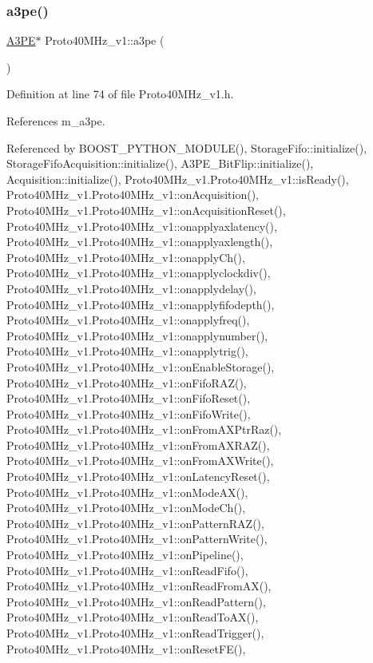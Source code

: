\subsubsection{\texorpdfstring{a3pe()}{a3pe()}}
{\footnotesize\ttfamily \hyperlink{classA3PE}{A3\+PE}$\ast$ Proto40\+M\+Hz\+\_\+v1\+::a3pe (\begin{DoxyParamCaption}{ }\end{DoxyParamCaption})\hspace{0.3cm}{\ttfamily [inline]}}



Definition at line 74 of file Proto40\+M\+Hz\+\_\+v1.\+h.



References m\+\_\+a3pe.



Referenced by B\+O\+O\+S\+T\+\_\+\+P\+Y\+T\+H\+O\+N\+\_\+\+M\+O\+D\+U\+L\+E(), Storage\+Fifo\+::initialize(), Storage\+Fifo\+Acquisition\+::initialize(), A3\+P\+E\+\_\+\+Bit\+Flip\+::initialize(), Acquisition\+::initialize(), Proto40\+M\+Hz\+\_\+v1.\+Proto40\+M\+Hz\+\_\+v1\+::is\+Ready(), Proto40\+M\+Hz\+\_\+v1.\+Proto40\+M\+Hz\+\_\+v1\+::on\+Acquisition(), Proto40\+M\+Hz\+\_\+v1.\+Proto40\+M\+Hz\+\_\+v1\+::on\+Acquisition\+Reset(), Proto40\+M\+Hz\+\_\+v1.\+Proto40\+M\+Hz\+\_\+v1\+::onapplyaxlatency(), Proto40\+M\+Hz\+\_\+v1.\+Proto40\+M\+Hz\+\_\+v1\+::onapplyaxlength(), Proto40\+M\+Hz\+\_\+v1.\+Proto40\+M\+Hz\+\_\+v1\+::onapply\+Ch(), Proto40\+M\+Hz\+\_\+v1.\+Proto40\+M\+Hz\+\_\+v1\+::onapplyclockdiv(), Proto40\+M\+Hz\+\_\+v1.\+Proto40\+M\+Hz\+\_\+v1\+::onapplydelay(), Proto40\+M\+Hz\+\_\+v1.\+Proto40\+M\+Hz\+\_\+v1\+::onapplyfifodepth(), Proto40\+M\+Hz\+\_\+v1.\+Proto40\+M\+Hz\+\_\+v1\+::onapplyfreq(), Proto40\+M\+Hz\+\_\+v1.\+Proto40\+M\+Hz\+\_\+v1\+::onapplynumber(), Proto40\+M\+Hz\+\_\+v1.\+Proto40\+M\+Hz\+\_\+v1\+::onapplytrig(), Proto40\+M\+Hz\+\_\+v1.\+Proto40\+M\+Hz\+\_\+v1\+::on\+Enable\+Storage(), Proto40\+M\+Hz\+\_\+v1.\+Proto40\+M\+Hz\+\_\+v1\+::on\+Fifo\+R\+A\+Z(), Proto40\+M\+Hz\+\_\+v1.\+Proto40\+M\+Hz\+\_\+v1\+::on\+Fifo\+Reset(), Proto40\+M\+Hz\+\_\+v1.\+Proto40\+M\+Hz\+\_\+v1\+::on\+Fifo\+Write(), Proto40\+M\+Hz\+\_\+v1.\+Proto40\+M\+Hz\+\_\+v1\+::on\+From\+A\+X\+Ptr\+Raz(), Proto40\+M\+Hz\+\_\+v1.\+Proto40\+M\+Hz\+\_\+v1\+::on\+From\+A\+X\+R\+A\+Z(), Proto40\+M\+Hz\+\_\+v1.\+Proto40\+M\+Hz\+\_\+v1\+::on\+From\+A\+X\+Write(), Proto40\+M\+Hz\+\_\+v1.\+Proto40\+M\+Hz\+\_\+v1\+::on\+Latency\+Reset(), Proto40\+M\+Hz\+\_\+v1.\+Proto40\+M\+Hz\+\_\+v1\+::on\+Mode\+A\+X(), Proto40\+M\+Hz\+\_\+v1.\+Proto40\+M\+Hz\+\_\+v1\+::on\+Mode\+Ch(), Proto40\+M\+Hz\+\_\+v1.\+Proto40\+M\+Hz\+\_\+v1\+::on\+Pattern\+R\+A\+Z(), Proto40\+M\+Hz\+\_\+v1.\+Proto40\+M\+Hz\+\_\+v1\+::on\+Pattern\+Write(), Proto40\+M\+Hz\+\_\+v1.\+Proto40\+M\+Hz\+\_\+v1\+::on\+Pipeline(), Proto40\+M\+Hz\+\_\+v1.\+Proto40\+M\+Hz\+\_\+v1\+::on\+Read\+Fifo(), Proto40\+M\+Hz\+\_\+v1.\+Proto40\+M\+Hz\+\_\+v1\+::on\+Read\+From\+A\+X(), Proto40\+M\+Hz\+\_\+v1.\+Proto40\+M\+Hz\+\_\+v1\+::on\+Read\+Pattern(), Proto40\+M\+Hz\+\_\+v1.\+Proto40\+M\+Hz\+\_\+v1\+::on\+Read\+To\+A\+X(), Proto40\+M\+Hz\+\_\+v1.\+Proto40\+M\+Hz\+\_\+v1\+::on\+Read\+Trigger(), Proto40\+M\+Hz\+\_\+v1.\+Proto40\+M\+Hz\+\_\+v1\+::on\+Reset\+F\+E(), 